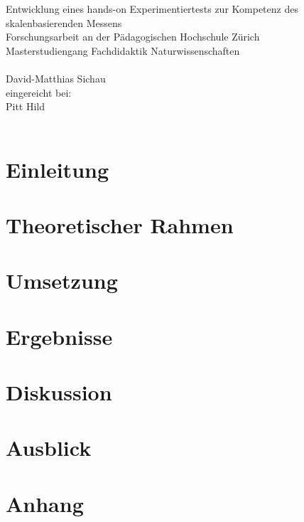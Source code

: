 \documentclass[oneside, DIV10]{scrartcl}
\begin{document}
\begin{titlepage}
	\vspace*{2cm}
	\begin{center}
		{\LARGE Entwicklung eines hands-on Experimentiertests zur Kompetenz des skalenbasierenden Messens\\
		\vspace*{2cm} Forschungsarbeit an der Pädagogischen Hochschule Zürich\vspace*{1cm}\\Masterstudiengang Fachdidaktik Naturwissenschaften\\}
		\vspace*{2cm}{\normalsize vorgelegt von:}\\ \large David-Matthias Sichau \\
		\vspace*{1.5cm} {\normalsize  eingereicht bei:}\\ \large Pitt Hild \\
		\vspace*{2cm}{\large 05. Februar 2015, Zürich}\\
	\end{center}
\end{titlepage}




\tableofcontents









\section{Einleitung}

\section{Theoretischer Rahmen}

\section{Umsetzung}

\section{Ergebnisse}

\section{Diskussion}

\section{Ausblick}



\appendix 





\printbibliography[heading=bibintoc]

\section{Anhang}

\end{document}

